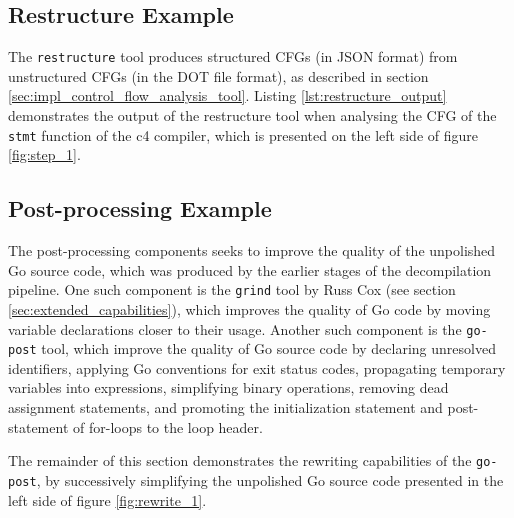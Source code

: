 \clearpage


\subsection{Restructure Example}
\label{app:restructure_example}


The \texttt{restructure} tool produces structured CFGs (in JSON format) from unstructured CFGs (in the DOT file format), as described in section \ref{sec:impl_control_flow_analysis_tool}. Listing \ref{lst:restructure_output} demonstrates the output of the restructure tool when analysing the CFG of the \texttt{stmt} function of the c4 compiler, which is presented on the left side of figure \ref{fig:step_1}.



\clearpage


\subsection{Post-processing Example}

The post-processing components seeks to improve the quality of the unpolished Go source code, which was produced by the earlier stages of the decompilation pipeline. One such component is the \texttt{grind} tool by Russ Cox (see section \ref{sec:extended_capabilities}), which improves the quality of Go code by moving variable declarations closer to their usage. Another such component is the \texttt{go-post} tool, which improve the quality of Go source code by declaring unresolved identifiers, applying Go conventions for exit status codes, propagating temporary variables into expressions, simplifying binary operations, removing dead assignment statements, and promoting the initialization statement and post-statement of for-loops to the loop header.

The remainder of this section demonstrates the rewriting capabilities of the \texttt{go-post}, by successively simplifying the unpolished Go source code presented in the left side of figure \ref{fig:rewrite_1}.

